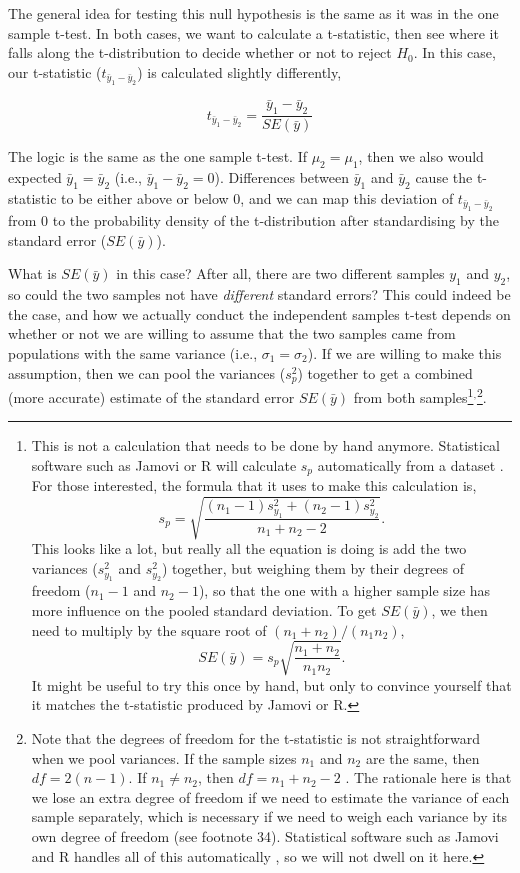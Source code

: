 \documentclass[
]{scrbook}
\begin{document}
The general idea for testing this null hypothesis is the same as it was in the one sample t-test.
In both cases, we want to calculate a t-statistic, then see where it falls along the t-distribution to decide whether or not to reject \(H_{0}\).
In this case, our t-statistic (\(t_{\bar{y}_{1} - \bar{y}_{2}}\)) is calculated slightly differently,

\[t_{\bar{y}_{1} - \bar{y}_{2}} = \frac{\bar{y}_{1} - \bar{y}_{2}}{SE(\bar{y})}\]

The logic is the same as the one sample t-test.
If \(\mu_{2} = \mu_{1}\), then we also would expected \(\bar{y}_{1} = \bar{y}_{2}\) (i.e., \(\bar{y}_{1} - \bar{y}_{2} = 0\)).
Differences between \(\bar{y}_{1}\) and \(\bar{y}_{2}\) cause the t-statistic to be either above or below 0, and we can map this deviation of \(t_{\bar{y}_{1} - \bar{y}_{2}}\) from 0 to the probability density of the t-distribution after standardising by the standard error (\(SE(\bar{y})\)).

What is \(SE(\bar{y})\) in this case?
After all, there are two different samples \(y_{1}\) and \(y_{2}\), so could the two samples not have \emph{different} standard errors?
This could indeed be the case, and how we actually conduct the independent samples t-test depends on whether or not we are willing to assume that the two samples came from populations with the same variance (i.e., \(\sigma_{1} = \sigma_{2}\)).
If we are willing to make this assumption, then we can pool the variances (\(s^{2}_{p}\)) together to get a combined (more accurate) estimate of the standard error \(SE(\bar{y})\) from both samples\footnote{This is not a calculation that needs to be done by hand anymore. Statistical software such as Jamovi or R will calculate \(s_{p}\) automatically from a dataset \citep{Jamovi2022, Rproject}. For those interested, the formula that it uses to make this calculation is, \[s_{p} = \sqrt{\frac{\left(n_{1} - 1 \right) s^{2}_{y_{1}} + \left(n_{2} - 1 \right) s^{2}_{y_{2}}}{n_{1} + n_{2} - 2}}.\] This looks like a lot, but really all the equation is doing is add the two variances (\(s^{2}_{y_{1}}\) and \(s^{2}_{y_{2}}\)) together, but weighing them by their degrees of freedom (\(n_{1} - 1\) and \(n_{2} - 1\)), so that the one with a higher sample size has more influence on the pooled standard deviation. To get \(SE(\bar{y})\), we then need to multiply by the square root of \((n_{1} + n_{2})/(n_{1}n_{2})\), \[SE(\bar{y}) = s_{p}\sqrt{\frac{n_{1} + n_{2}}{n_{1}n_{2}}}.\] It might be useful to try this once by hand, but only to convince yourself that it matches the t-statistic produced by Jamovi or R.}\(^{,}\)\footnote{Note that the degrees of freedom for the t-statistic is not straightforward when we pool variances. If the sample sizes \(n_{1}\) and \(n_{2}\) are the same, then \(df = 2(n - 1)\). If \(n_{1} \neq n_{2}\), then \(df = n_{1} + n_{2} - 2\) \citep{Sokal1995}. The rationale here is that we lose an extra degree of freedom if we need to estimate the variance of each sample separately, which is necessary if we need to weigh each variance by its own degree of freedom (see footnote 34). Statistical software such as Jamovi and R handles all of this automatically \citep{Jamovi2022, Rproject}, so we will not dwell on it here.}.
\end{document}
